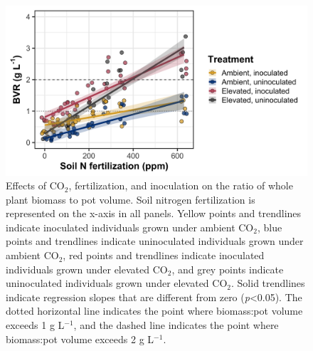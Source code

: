 \newpage
\begin{figure}
    \centering
    \includegraphics[width=\linewidth]{ch5_NxCO2xI/figs/NxCO2xI_figS2_bvr.png}
    \caption[Effects of CO$_2$, fertilization, and inoculation on the ratio of whole plant biomass to pot volume]{Effects of CO$_2$, fertilization, and inoculation on the ratio of whole plant biomass to pot volume. Soil nitrogen fertilization is represented on the x-axis in all panels. Yellow points and trendlines indicate inoculated individuals grown under ambient CO$_2$, blue points and trendlines indicate uninoculated individuals grown under ambient CO$_2$, red points and trendlines indicate inoculated individuals grown under elevated CO$_2$, and grey points indicate uninoculated individuals grown under elevated CO$_2$. Solid trendlines indicate regression slopes that are different from zero (\textit{p}<0.05). The dotted horizontal line indicates the point where biomass:pot volume exceeds 1 g L$^{-1}$, and the dashed line indicates the point where biomass:pot volume exceeds 2 g L$^{-1}$.}
    \label{fig:figure.d2}
\end{figure}
\clearpage
